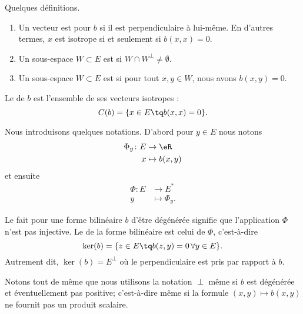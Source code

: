 \begin{definition}   \label{DefVKMnUEM}
	Quelques définitions.
	\begin{enumerate}
		\item
		      Un vecteur est  pour \( b\) si il est perpendiculaire à lui-même. En d'autres termes, \( x\) est isotrope si et seulement si \( b(x,x)=0\).
		\item
		      Un sous-espace \( W\subset E\) est  si \( W\cap W^{\perp}\neq \emptyset\).
		\item

		      Un sous-espace \( W\subset E\) est  si pour tout \( x,y\in W\), nous avons \( b(x,y)=0\).
	\end{enumerate}

	Le  de \( b\) est l'ensemble de ses vecteurs isotropes :
	\begin{equation}
		C(b)=\{ x\in E\tq b(x,x)=0 \}.
	\end{equation}
\end{definition}
Nous introduisons quelques notations. D'abord pour \( y\in E\) nous notons
\begin{equation}
	\begin{aligned}
		\Phi_y\colon E & \to \eR        \\
		x              & \mapsto b(x,y)
	\end{aligned}
\end{equation}
et ensuite
\begin{equation}
	\begin{aligned}
		\Phi\colon E & \to E^*         \\
		y            & \mapsto \Phi_y.
	\end{aligned}
\end{equation}

\begin{definition}		\label{DEFooHKQVooPuWZiP}
	Le fait pour une forme bilinéaire \( b\) d'être dégénérée signifie que l'application \( \Phi\) n'est pas injective. Le  de la forme bilinéaire est celui de \( \Phi\), c'est-à-dire
	\begin{equation}
		\ker(b)=\{ z\in E\tq b(z,y)=0\,\forall y\in E \}.
	\end{equation}
	Autrement dit, \( \ker(b)=E^{\perp}\) où le perpendiculaire est pris par rapport à \( b\).
\end{definition}
Notons tout de même que nous utilisons la notation \( \perp\) même si \( b\) est dégénérée et éventuellement pas positive; c'est-à-dire même si la formule \( (x,y)\mapsto b(x,y)\) ne fournit pas un produit scalaire.


